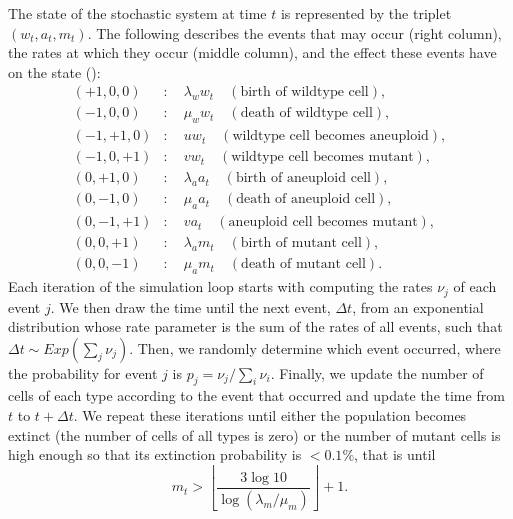 \documentclass[12pt]{extarticle}
\begin{document}
The state of the stochastic system at time $t$ is represented by the triplet $\left(w_t,a_t,m_t\right)$. The following describes the events that may occur (right column), the rates at which they occur (middle column), and the effect these events have on the state ():
\begin{subequations}
\begin{flalign*}
(+1,0,0)&:\quad \lambda_ww_t\quad\left(\text{birth of wildtype cell}\right),\\
(-1,0,0)&:\quad \mu_ww_t\quad\left(\text{death of wildtype cell}\right),\\
(-1,+1,0)&:\quad uw_t\quad\left(\text{wildtype cell becomes aneuploid}\right),\\
(-1,0,+1)&:\quad vw_t\quad\left(\text{wildtype cell becomes mutant}\right),\\
(0,+1,0)&:\quad \lambda_aa_t\quad\left(\text{birth of aneuploid cell}\right),\\
(0,-1,0)&:\quad \mu_aa_t\quad\left(\text{death of aneuploid cell}\right),\\
(0,-1,+1)&:\quad va_t\quad\left(\text{aneuploid cell becomes mutant}\right),\\
(0,0,+1)&:\quad \lambda_am_t\quad\left(\text{birth of mutant cell}\right),\\
(0,0,-1)&:\quad \mu_am_t\quad\left(\text{death of mutant cell}\right).
\end{flalign*}
\end{subequations}
Each iteration of the simulation loop starts with computing the rates $\nu_j$ of each event $j$.
We then draw the time until the next event, $\Delta t$, from an exponential distribution whose rate parameter is the sum of the rates of all events, such that $\Delta t \sim \textit{Exp}(\sum_j \nu_j)$.
Then, we randomly determine which event occurred, where the probability for event $j$ is $p_j=\nu_j/\sum_i \nu_i$.
Finally, we update the number of cells of each type according to the event that occurred and update the time from $t$ to $t+\Delta t$.
We repeat these iterations until either the population becomes extinct (the number of cells of all types is zero) or the number of mutant cells is high enough so that its extinction probability is $<0.1\%$, that is until
\begin{equation*}
m_t > \left\lfloor\frac{3\log10}{\log\left(\lambda_m / \mu_m\right)}\right\rfloor + 1.
\end{equation*}

\end{document}
